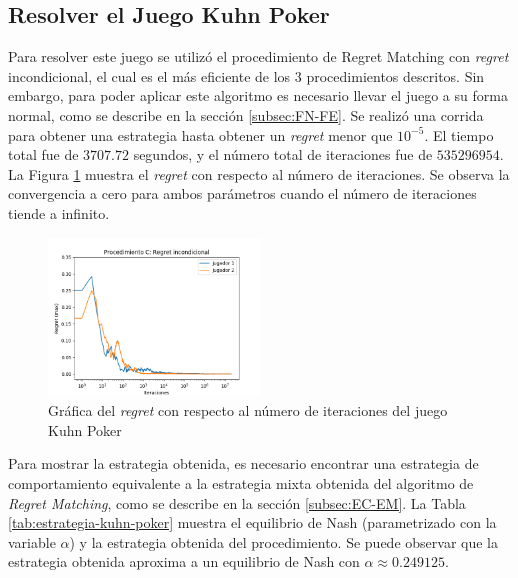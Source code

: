 \subsection{Resolver el Juego Kuhn Poker}

Para resolver este juego se utilizó el procedimiento de Regret Matching con \textit{regret} incondicional, el cual es el más eficiente de los $3$ procedimientos descritos. Sin embargo, para poder aplicar este algoritmo es necesario llevar el juego a su forma normal, como se describe en la sección \ref{subsec:FN-FE}. Se realizó una corrida para obtener una estrategia hasta obtener un \textit{regret} menor que $10^{-5}$. El tiempo total fue de $3707.72$ segundos, y el número total de iteraciones fue de $535296954$. La Figura \ref{fig:regret-kuhn-poker} muestra el \textit{regret} con respecto al número de iteraciones. Se observa la convergencia a cero para ambos parámetros cuando el número de iteraciones tiende a infinito.

\begin{figure}[ht]
\caption{Gráfica del \textit{regret} con respecto al número de iteraciones del juego Kuhn Poker}
\label{fig:regret-kuhn-poker}
\centering
\includegraphics[width=0.5\textwidth]{graficas/kuhn/procedimiento-C.png}
\end{figure}

Para mostrar la estrategia obtenida, es necesario encontrar una estrategia de comportamiento equivalente a la estrategia mixta obtenida del algoritmo de \textit{Regret Matching}, como se describe en la sección \ref{subsec:EC-EM}. La Tabla \ref{tab:estrategia-kuhn-poker} muestra el equilibrio de Nash (parametrizado con la variable $\alpha$) y la estrategia obtenida del procedimiento. Se puede observar que la estrategia obtenida aproxima a un equilibrio de Nash con $\alpha \approx 0.249125$.

